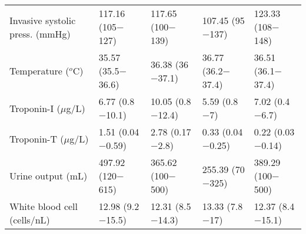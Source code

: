 \begin{table*} [ht!]
{\begin{tabular}{lllll}
Invasive systolic press. (mmHg)  &  117.16 (105$-$127)  &  117.65 (100$-$139)  &  107.45 (95$-$137)  &  123.33 (108$-$148) \\
Temperature ($^o$C)  &  35.57 (35.5$-$36.6)  &  36.38 (36$-$37.1)  &  36.77 (36.2$-$37.4)  &  36.51 (36.1$-$37.4) \\
Troponin-I ($\mu$g/L)  &  6.77 (0.8$-$10.1)  &  10.05 (0.8$-$12.4)  &  5.59 (0.8$-$7)  &  7.02 (0.4$-$6.7) \\
Troponin-T ($\mu$g/L)  &  1.51 (0.04$-$0.59)  &  2.78 (0.17$-$2.8)  &  0.33 (0.04$-$0.25)  &  0.22 (0.03$-$0.14) \\
Urine output (mL)  &  497.92 (120$-$615)  &  365.62 (100$-$500)  &  255.39 (70$-$325)  &  389.29 (100$-$500) \\
White blood cell (cells/nL)  &  12.98 (9.2$-$15.5)  &  12.31 (8.5$-$14.3)  &  13.33 (7.8$-$17)  &  12.37 (8.4$-$15.1)\\
\hline
\end{tabular}}
\label{tab:physionet}
\end{table*}
